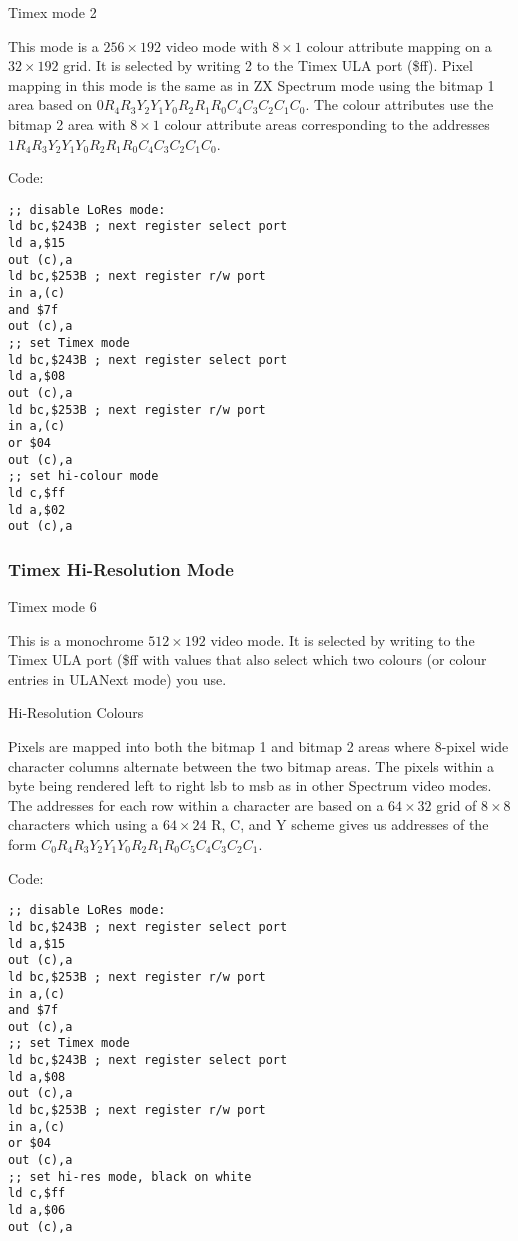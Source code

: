 Timex mode 2

This mode is a $256\times192$ video mode with $8\times1$ colour
attribute mapping on a $32\times192$ grid. It is selected by writing 2
to the Timex ULA port (\$ff).  Pixel mapping in this mode is the same
as in ZX Spectrum mode using the bitmap 1 area based on
$0R_4R_3Y_2Y_1Y_0R_2R_1R_0C_4C_3C_2C_1C_0$.  The colour attributes use
the bitmap 2 area with $8\times1$ colour attribute areas corresponding
to the addresses $1R_4R_3Y_2Y_1Y_0R_2R_1R_0C_4C_3C_2C_1C_0$.

Code:
\begin{verbatim}
;; disable LoRes mode:
ld bc,$243B ; next register select port
ld a,$15
out (c),a
ld bc,$253B ; next register r/w port
in a,(c)
and $7f
out (c),a
;; set Timex mode
ld bc,$243B ; next register select port
ld a,$08
out (c),a
ld bc,$253B ; next register r/w port
in a,(c)
or $04
out (c),a
;; set hi-colour mode
ld c,$ff
ld a,$02
out (c),a
\end{verbatim}

\subsubsection{Timex Hi-Resolution Mode}

Timex mode 6

This is a monochrome $512\times192$ video mode. It is selected by
writing to the Timex ULA port (\$ff with values that also select which
two colours (or colour entries in ULANext mode) you use.

\begin{table}[h]\centering
  \caption{Hi-Resolution Colours}
\end{table}
  
Pixels are mapped into both the bitmap 1 and bitmap 2 areas where
8-pixel wide character columns alternate between the two bitmap areas.
The pixels within a byte being rendered left to right lsb to msb as in
other Spectrum video modes.  The addresses for each row within a
character are based on a $64\times32$ grid of $8\times8$ characters
which using a $64\times24$ R, C, and Y scheme gives us addresses of
the form $C_0R_4R_3Y_2Y_1Y_0R_2R_1R_0C_5C_4C_3C_2C_1$.

Code:
\begin{verbatim}
;; disable LoRes mode:
ld bc,$243B ; next register select port
ld a,$15
out (c),a
ld bc,$253B ; next register r/w port
in a,(c)
and $7f
out (c),a
;; set Timex mode
ld bc,$243B ; next register select port
ld a,$08
out (c),a
ld bc,$253B ; next register r/w port
in a,(c)
or $04
out (c),a
;; set hi-res mode, black on white
ld c,$ff
ld a,$06
out (c),a
\end{verbatim}

